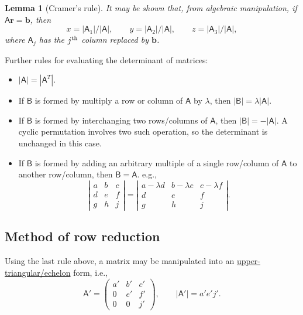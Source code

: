 \documentclass[10pt,notitlepage]{revtex4-1}
\newtheorem{lemma}[theorem]{Lemma}
\newcommand{\bb}{{\boldsymbol{b}}}
\begin{document}
\begin{lemma}[Cramer's rule]
	It may be shown that, from algebraic manipulation, if
	$\mathsf{A}\boldsymbol{r}=\bb$, then
	\begin{equation}
		x=|\mathsf{A}_{1}|/|\mathsf{A}|,\qquad
		y=|\mathsf{A}_{2}|/|\mathsf{A}|,\qquad
		z=|\mathsf{A}_{3}|/|\mathsf{A}|,
	\end{equation}
	where $\mathsf{A}_{j}$ has the $j^{\textnormal{th}}$ column replaced by
	$\bb$.
\end{lemma}

Further rules for evaluating the determinant of matrices:
\begin{itemize}
	\item $|\mathsf{A}|=|\mathsf{A}^{T}|$.
	\item If $\mathsf{B}$ is formed by multiply a row or column of $\mathsf{A}$
	by $\lambda$, then $|\mathsf{B}|=\lambda|\mathsf{A}|$.
	\item If $\mathsf{B}$ is formed by interchanging two rows/columns of
	$\mathsf{A}$, then $|\mathsf{B}|=-|\mathsf{A}|$. A cyclic permutation
	involves two such operation, so the determinant is unchanged in this case.
	\item If $\mathsf{B}$ is formed by adding an arbitrary multiple of a single
	row/column of $\mathsf{A}$ to another row/column, then
	$\mathsf{B}=\mathsf{A}$. e.g.,
	\begin{equation}
		\left|\begin{matrix}a & b & c\\ d & e & f\\ g & h & j\end{matrix}\right|
		=\left|\begin{matrix}a-\lambda d & b-\lambda e & c-\lambda f
		\\ d & e & f\\ g & h & j\end{matrix}\right|.
	\end{equation}
\end{itemize}


\subsection{Method of row reduction}

Using the last rule above, a matrix may be manipulated into an
\underline{upper-triangular/echelon} form, i.e.,
\begin{equation}
	\mathsf{A}'=\begin{pmatrix}a' & b' & c'\\ 0 & e' & f'\\
	0 & 0 & j'\end{pmatrix},\qquad |\mathsf{A}'|=a'e'j'.
\end{equation}
\end{document}
